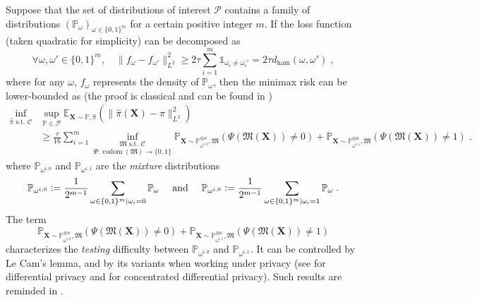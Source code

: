 \documentclass[10pt]{article} %
\def\Ind{\mathds{1}}
\newcommand{\Prob}[0]{\mathbb{P}}
\newcommand{\E}[0]{\mathbb{E}}
\newcommand{\eqdef}{\vcentcolon=}
\newcommand\mech[1]{\mathfrak{#1}}
\newcommand\vect[1]{\mathbf{#1}}
\newcommand\codom[1]{\operatorname{codom}\left({#1}\right)}
\newcommand\ham[2]{d_\mathrm{ham}\left( {#1}, {#2} \right)}
\newcommand\p[1]{\left( {#1}\right)}
\begin{document}
Suppose that the set of distributions of interest $\mathcal{P}$ contains a family of distributions $(\Prob_\omega)_{\omega \in \{0, 1 \}^m}$ for a certain positive integer $m$. If the loss function (taken quadratic for simplicity) can be decomposed as 
\begin{equation}
\label{eq:Assouadcondition}
    \forall \omega, \omega' \in \{0, 1 \}^m, \quad \| f_\omega - f_{\omega '} \|_{L^2}^2
    \geq 
    2 \tau \sum_{i=1}^m \Ind_{\omega_{i} \neq \omega_{i}'} = 2 \tau\ham{\omega}{\omega'}\;,
\end{equation}
where for any $\omega$, $f_\omega$ represents the density of $\Prob_\omega$,
then the minimax risk can be lower-bounded as (the proof is classical and can be found in \citet[Section 5.4]{acharya2021differentially})
\begin{equation}
\label{eq:Assouadprivate}
\begin{aligned}
    \inf_{\hat{\pi} \text{ s.t. } \mathcal{C}} &\sup_{\Prob \in \mathcal{P}}  \E_{\vect{X} \sim \Prob, \hat{\pi}} (\|\hat{\pi}(\vect{X}) - \pi \|_{L^2}^2) \\
    &\geq 
    \frac{\tau}{16} \sum_{i=1}^m \underset{\Psi : \codom{\mech{M}} \rightarrow \{0, 1\}}{\inf_{\mech{M} \text{ s.t. } \mathcal{C}}} \Prob_{\mathbf{X} \sim \Prob_{\omega^{i, 0}}^{\otimes n}, \mech{M}} \p{ \Psi \p{\mech{M}(\vect{X})} \neq 0} + \Prob_{\mathbf{X} \sim \Prob_{\omega^{i, 1}}^{\otimes n}, \mech{M}} \p{ \Psi \p{\mech{M}(\vect{X})} \neq 1}\;.
\end{aligned}
\end{equation}
where $\Prob_{\omega^{i, 0}}$ and $\Prob_{\omega^{i, 1}}$ are the \emph{mixture} distributions
\begin{equation}\label{eq:AssouadMixtures}
    \Prob_{\omega^{i, 0}} \eqdef \frac{1}{2^{m-1}} \sum_{\omega \in \{0, 1 \}^m | \omega_i = 0} \Prob_\omega 
    \quad \text{ and }
    \quad 
    \Prob_{\omega^{i, 0}} \eqdef \frac{1}{2^{m-1}} \sum_{\omega \in \{0, 1 \}^m | \omega_i = 1} \Prob_\omega \;.
\end{equation}
The term 
\begin{equation*}
    \Prob_{\mathbf{X} \sim \Prob_{\omega^{i, 0}}^{\otimes n}, \mech{M}} \p{ \Psi \p{\mech{M}(\vect{X})} \neq 0} + \Prob_{\mathbf{X} \sim \Prob_{\omega^{i, 1}}^{\otimes n}, \mech{M}} \p{ \Psi \p{\mech{M}(\vect{X})} \neq 1}
\end{equation*}
characterizes the \emph{testing} difficulty between $\Prob_{\omega^{i, 0}}$ and $\Prob_{\omega^{i, 1}}$. It can be controlled by Le Cam's lemma, and by its variants when working under privacy (see \citet{acharya2021differentially,lalanne2022statistical} for differential privacy and \citet{lalanne2022statistical} for concentrated differential privacy). Such results are reminded in .
\end{document}
